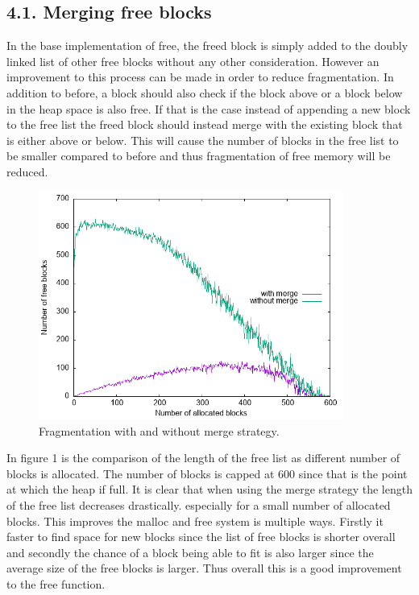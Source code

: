 \documentclass[a4paper,11pt]{scrartcl}
\begin{document}
{\subsection*{4.1. Merging free blocks}
In the base implementation of free, the freed block is simply added to the doubly linked list of other free blocks without any other consideration. However an improvement to this process can be made in order to reduce fragmentation. In addition to before, a block should also check if the block above or a block below in the heap space is also free. If that is the case instead of appending a new block to the free list the freed block should instead merge with the existing block that is either above or below. This will cause the number of blocks in the free list to be smaller compared to before and thus fragmentation of free memory will be reduced. 
\newpage
\begin{figure}[htp]
    \centering
    \includegraphics[width=10cm]{gnuplot/fragmentation.png}
    \caption{Fragmentation with and without merge strategy.}
    \label{fig:Graph}
\end{figure}
In figure 1 is the comparison of the length of the free list as different number of blocks is allocated. The number of blocks is capped at 600 since that is the point at which the heap if full. It is clear that when using the merge strategy the length of the free list decreases drastically. especially for a small number of allocated blocks. This improves the malloc and free system is multiple ways. Firstly it faster to find space for new blocks since the list of free blocks is shorter overall and secondly the chance of a block being able to fit is also larger since the average size of the free blocks is larger. Thus overall this is a good improvement to the free function.
}
\end{document}
